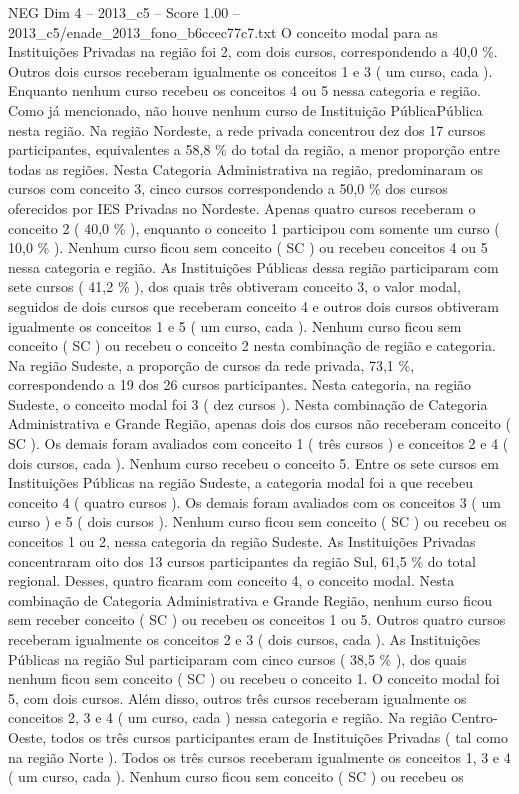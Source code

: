 \begin{textsample}{NEG Dim 4 – 2013\_c5 – Score 1.00 – 2013\_c5/enade\_2013\_fono\_b6ccec77c7.txt}
O conceito modal para as Instituições Privadas na região foi 2, com dois cursos, correspondendo a 40,0 \%.
Outros dois cursos receberam igualmente os conceitos 1 e 3 ( um curso, cada ).
Enquanto nenhum curso recebeu os conceitos 4 ou 5 nessa categoria e região.
Como já mencionado, não houve nenhum curso de Instituição PúblicaPública nesta região.
Na região Nordeste, a rede privada concentrou dez dos 17 cursos participantes, equivalentes a 58,8 \% do total da região, a menor proporção entre todas as regiões.
Nesta Categoria Administrativa na região, predominaram os cursos com conceito 3, cinco cursos correspondendo a 50,0 \% dos cursos oferecidos por IES Privadas no Nordeste.
Apenas quatro cursos receberam o conceito 2 ( 40,0 \% ), enquanto o conceito 1 participou com somente um curso ( 10,0 \% ).
Nenhum curso ficou sem conceito ( SC ) ou recebeu conceitos 4 ou 5 nessa categoria e região.
As Instituições Públicas dessa região participaram com sete cursos ( 41,2 \% ), dos quais três obtiveram conceito 3, o valor modal, seguidos de dois cursos que receberam conceito 4 e outros dois cursos obtiveram igualmente os conceitos 1 e 5 ( um curso, cada ).
Nenhum curso ficou sem conceito ( SC ) ou recebeu o conceito 2 nesta combinação de região e categoria.
Na região Sudeste, a proporção de cursos da rede privada, 73,1 \%, correspondendo a 19 dos 26 cursos participantes.
Nesta categoria, na região Sudeste, o conceito modal foi 3 ( dez cursos ).
Nesta combinação de Categoria Administrativa e Grande Região, apenas dois dos cursos não receberam conceito ( SC ).
Os demais foram avaliados com conceito 1 ( três cursos ) e conceitos 2 e 4 ( dois cursos, cada ).
Nenhum curso recebeu o conceito 5.
Entre os sete cursos em Instituições Públicas na região Sudeste, a categoria modal foi a que recebeu conceito 4 ( quatro cursos ).
Os demais foram avaliados com os conceitos 3 ( um curso ) e 5 ( dois cursos ).
Nenhum curso ficou sem conceito ( SC ) ou recebeu os conceitos 1 ou 2, nessa categoria da região Sudeste.
As Instituições Privadas concentraram oito dos 13 cursos participantes da região Sul, 61,5 \% do total regional.
Desses, quatro ficaram com conceito 4, o conceito modal.
Nesta combinação de Categoria Administrativa e Grande Região, nenhum curso ficou sem receber conceito ( SC ) ou recebeu os conceitos 1 ou 5.
Outros quatro cursos receberam igualmente os conceitos 2 e 3 ( dois cursos, cada ).
As Instituições Públicas na região Sul participaram com cinco cursos ( 38,5 \% ), dos quais nenhum ficou sem conceito ( SC ) ou recebeu o conceito 1.
O conceito modal foi 5, com dois cursos.
Além disso, outros três cursos receberam igualmente os conceitos 2, 3 e 4 ( um curso, cada ) nessa categoria e região.
Na região Centro-Oeste, todos os três cursos participantes eram de Instituições Privadas ( tal como na região Norte ).
Todos os três cursos receberam igualmente os conceitos 1, 3 e 4 ( um curso, cada ).
Nenhum curso ficou sem conceito ( SC ) ou recebeu os

\end{textsample}
